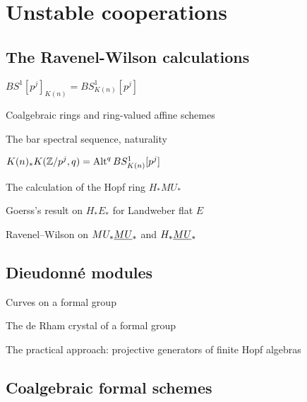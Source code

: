 
\chapter{Unstable cooperations}


\section{The Ravenel-Wilson calculations}

$BS^1[p^j]_{K(n)} = BS^1_{K(n)}[p^j]$

Coalgebraic rings and ring-valued affine schemes

The bar spectral sequence, naturality

$K(n)_* K(\mathbb Z/p^j, q) = \operatorname{Alt}^q BS^1_{K(n)}[p^j]$

The calculation of the Hopf ring $H_* MU_*$

Goerss's result on $H_* E_*$ for Landweber flat $E$

Ravenel--Wilson on $MU_* \smash{\underline{MU}}_{*}$ and $H_* \smash{\underline{MU}}_{*}$


\section{Dieudonn\'e modules}

Curves on a formal group

The de Rham crystal of a formal group

The practical approach: projective generators of finite Hopf algebras

\section{Coalgebraic formal schemes}
